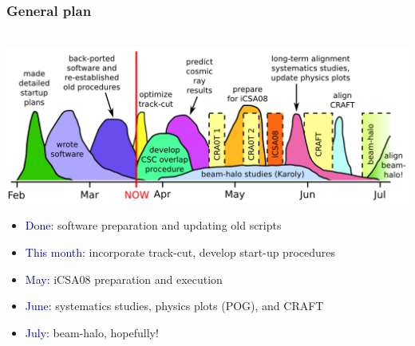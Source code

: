 \documentclass[compress]{beamer}
\begin{document}

\begin{frame}
\frametitle{General plan}

\mbox{\hspace{-0.75 cm} \includegraphics[width=1.12\linewidth]{plan.png}}

\small
\begin{itemize}
\item \textcolor{darkblue}{Done:} software preparation and updating old scripts
\item \textcolor{darkblue}{This month:} incorporate track-cut, develop start-up procedures
\item \textcolor{darkblue}{May:} iCSA08 preparation and execution
\item \textcolor{darkblue}{June:} systematics studies, physics plots (POG), and CRAFT
\item \textcolor{darkblue}{July:} beam-halo, hopefully!
\end{itemize}
\end{frame}
\end{document}
